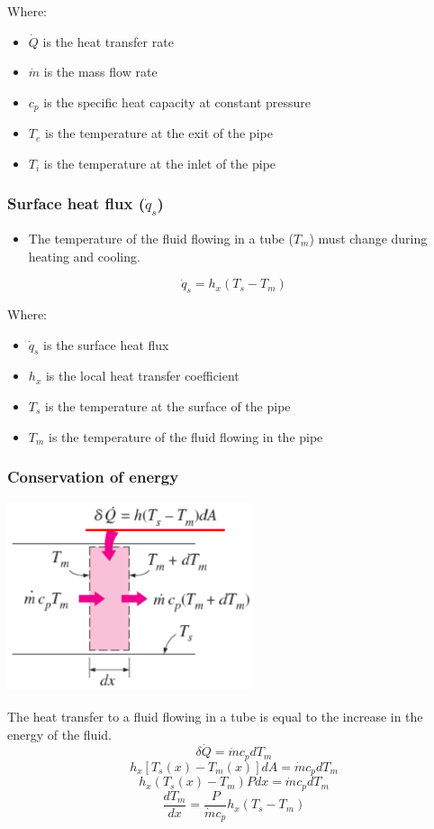 \documentclass[11pt]{article}
\begin{document}
Where:
\begin{itemize}
\item \(\dot{Q}\) is the heat transfer rate
\item \(\dot{m}\) is the mass flow rate
\item \(c_p\) is the specific heat capacity at constant pressure
\item \(T_e\) is the temperature at the exit of the pipe
\item \(T_i\) is the temperature at the inlet of the pipe
\end{itemize}
\subsubsection{Surface heat flux (\(\dot{q}_s\))}
\label{sec:org583f09f}
\begin{itemize}
\item The temperature of the fluid flowing in a tube (\(T_m\)) must change during heating and cooling.
\end{itemize}
\[\dot{q}_s = h_x (T_s - T_m)\]

Where:
\begin{itemize}
\item \(\dot{q}_s\) is the surface heat flux
\item \(h_x\) is the local heat transfer coefficient
\item \(T_s\) is the temperature at the surface of the pipe
\item \(T_m\) is the temperature of the fluid flowing in the pipe
\end{itemize}
\subsubsection{Conservation of energy}
\label{sec:org43ead6e}
\begin{center}
\includegraphics[height=15em]{./images/general-thermal-analysis-conservation-of-energy.png}
\end{center}
The heat transfer to a fluid flowing in a tube is equal to the increase in the energy of the fluid.
\[\delta \dot{Q} = \dot{m} c_p dT_m\]
\[h_x [T_s (x) - T_m (x)] dA = \dot{m} c_p dT_m\]
\[h_x (T_s (x) - T_m) P dx = \dot{m} c_p dT_m\]
\[\frac{dT_m}{dx} = \frac{P}{\dot{m} c_p} h_x (T_s - T_m)\]
\end{document}
